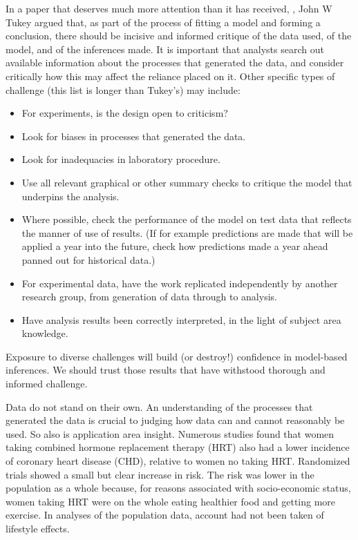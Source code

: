 In a paper that deserves much more attention than it has received,
\citep{tukey_1997}, John W Tukey
argued that, as part of the process of fitting a model and forming a
conclusion, there should be  incisive and informed critique of the data
used, of the model, and of the inferences made. It is important that
analysts search out available information about the processes that
generated the data, and consider critically how this may affect the
reliance placed on it. Other specific types of challenge (this list is
longer than Tukey's) may include:
\begin{itemize}
\tightlist
\item For experiments, is the design open to criticism?
\item Look for biases in processes that generated the data.
\item Look for inadequacies in laboratory procedure.
\item Use all relevant graphical or other summary checks to
critique the model that underpins the analysis.
\item Where possible, check the performance of the model on
test data that reflects the manner of use of results.
(If for example predictions are made that will be applied a
year into the future, check how predictions made a year
ahead panned out for historical data.)
\item For experimental data, have the work replicated
independently by another research group, from generation of
data through to analysis.
\item Have analysis results been correctly interpreted,
in the light of subject area knowledge.
\end{itemize}
Exposure to diverse challenges will build (or destroy!) confidence
in model-based inferences. We should trust those results that have
withstood thorough and informed challenge. 

Data do not stand on their own. An understanding of the processes
that generated the data is crucial to judging how data can and cannot
reasonably be used.  So also is application area insight. Numerous
studies found that women taking combined hormone replacement therapy
(HRT) also had a lower incidence of coronary heart disease (CHD),
relative to women no taking HRT.  Randomized trials showed a small
but clear increase in risk.  The risk was lower in the population
as a whole because, for reasons associated with socio-economic status,
women taking HRT were on the whole eating healthier food and getting
more exercise.  In analyses of the population data, account had not
been taken of lifestyle effects.

